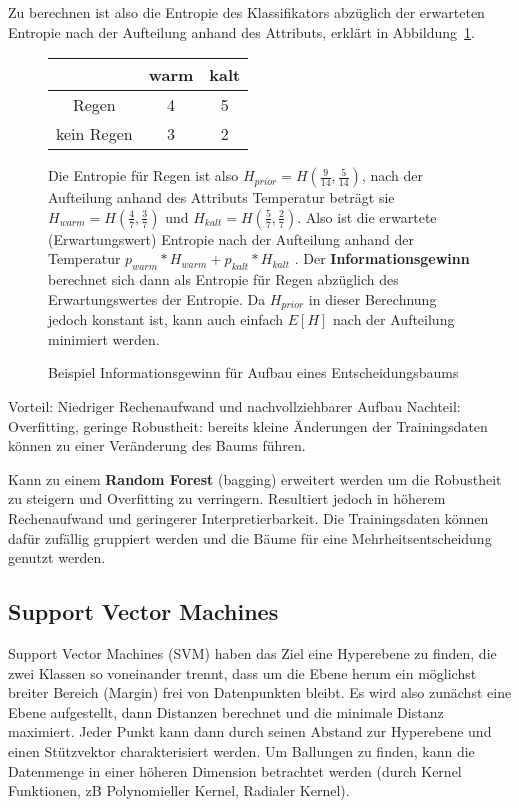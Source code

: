 \documentclass{article}
\begin{document}
Zu berechnen ist also die Entropie des Klassifikators abzüglich der erwarteten Entropie nach der Aufteilung anhand des Attributs, 
erklärt in Abbildung~\ref{ex:decisiontree}.
\begin{figure}[H]
\begin{minipage}{.3\textwidth}
\begin{tabular}{c|c|c}
    & warm & kalt \\
    \hline
    Regen &4  &5 \\
    \hline
    kein Regen & 3 & 2 \\
\end{tabular}
\end{minipage}
\begin{minipage}{.6\textwidth}
Die Entropie für Regen ist also $H_{prior} = H(\frac{9}{14},\frac{5}{14})$, 
nach der Aufteilung anhand des Attributs Temperatur beträgt sie $H_{warm}= H(\frac{4}{7}, \frac{3}{7})$
und $H_{kalt}= H(\frac{5}{7}, \frac{2}{7})$.
Also ist die erwartete (Erwartungswert) Entropie nach der Aufteilung anhand der Temperatur $p_{warm} * H_{warm} + p_{kalt} * H_{kalt} $ .
Der \textbf{Informationsgewinn} berechnet sich dann als Entropie für Regen abzüglich des Erwartungswertes der Entropie.
Da $H_{prior}$ in dieser Berechnung jedoch konstant ist, kann auch einfach $E[H]$ nach der Aufteilung minimiert werden.
\end{minipage}
\caption{Beispiel Informationsgewinn für Aufbau eines Entscheidungsbaums}
\label{ex:decisiontree}
\end{figure}


Vorteil: Niedriger Rechenaufwand und nachvollziehbarer Aufbau 
Nachteil: Overfitting, geringe Robustheit: bereits kleine Änderungen der Trainingsdaten können zu einer Veränderung des Baums führen.


Kann zu einem \textbf{Random Forest} (bagging) erweitert werden um die Robustheit zu steigern und Overfitting zu verringern.
Resultiert jedoch in höherem Rechenaufwand und geringerer Interpretierbarkeit.
Die Trainingsdaten können dafür zufällig gruppiert werden und die Bäume für eine Mehrheitsentscheidung genutzt werden.



\subsection{Support Vector Machines}
Support Vector Machines (SVM) haben das Ziel eine Hyperebene zu finden, die zwei Klassen so voneinander trennt,
dass um die Ebene herum ein möglichst breiter Bereich (Margin) frei von Datenpunkten bleibt.
Es wird also zunächst eine Ebene aufgestellt, dann Distanzen berechnet und die minimale Distanz maximiert.
Jeder Punkt kann dann durch seinen Abstand zur Hyperebene und einen Stützvektor charakterisiert werden.
Um Ballungen zu finden, kann die Datenmenge in einer höheren Dimension betrachtet werden (durch Kernel Funktionen, zB Polynomieller Kernel, Radialer Kernel).
\end{document}
